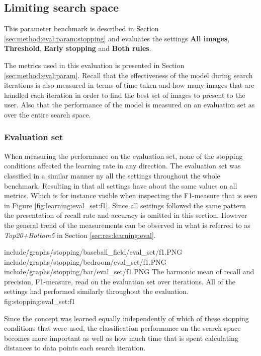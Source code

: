 
\subsection{Limiting search space}
\label{sec:res:stopping}

This parameter benchmark is described in Section \ref{sec:method:eval:param:stopping} and evaluates the  settings 
\textbf{All images}, \textbf{Threshold}, \textbf{Early stopping} and \textbf{Both rules}.

The metrics used in this evaluation is presented in Section \ref{sec:method:eval:param}. Recall that the effectiveness of the model during search iterations is also measured in terms of time taken and how many images that are handled each iteration in order to find the best set of images to present to the user. Also that the performance of the model is measured on an evaluation set as over the entire search space. 

\subsubsection{Evaluation set}
When measuring the performance on the evaluation set, none of the stopping conditions affected the learning rate in any direction. The evaluation set was  classified in a similar manner ny all the settings throughout the whole benchmark. 
Resulting in that all settings have about the same values on all metrics. Which is for instance visible when inspecting the F1-measure that is seen in Figure \ref{fig:learning:eval_set:f1}. Since all settings followed the same pattern the presentation of recall rate and accuracy is omitted in this section. However the general trend of the measurements can be observed in what is referred to as \emph{Top20+Bottom5} in Section \ref{sec:res:learning:eval}.

\tripfigure
{include/graphs/stopping/baseball_field/eval_set/f1.PNG}
{include/graphs/stopping/bedroom/eval_set/f1.PNG}
{include/graphs/stopping/bar/eval_set/f1.PNG}
{The harmonic mean of recall and precision, F1-measure, read on the evaluation set over iterations. All of the settings had performed similarly throughout the evaluation.}
{fig:stopping:eval_set:f1}

Since the concept was learned equally independently of which of these stopping conditions that were used, the classification performance on the search space becomes more important as well as how much time that is spent calculating distances to data points each search iteration.

